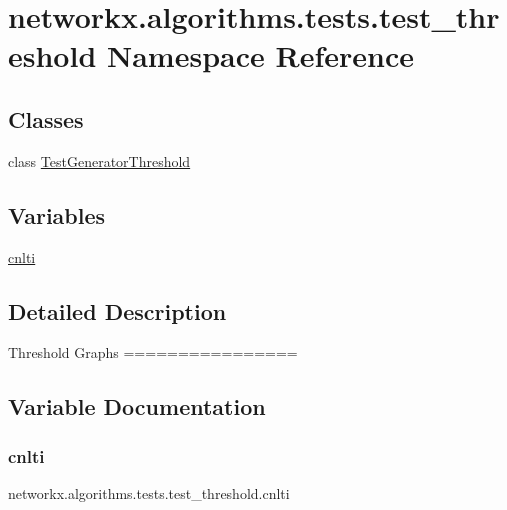 \hypertarget{namespacenetworkx_1_1algorithms_1_1tests_1_1test__threshold}{}\section{networkx.\+algorithms.\+tests.\+test\+\_\+threshold Namespace Reference}
\label{namespacenetworkx_1_1algorithms_1_1tests_1_1test__threshold}
\subsection*{Classes}
\begin{DoxyCompactItemize}
\item 
class \hyperlink{classnetworkx_1_1algorithms_1_1tests_1_1test__threshold_1_1TestGeneratorThreshold}{Test\+Generator\+Threshold}
\end{DoxyCompactItemize}
\subsection*{Variables}
\begin{DoxyCompactItemize}
\item 
\hyperlink{namespacenetworkx_1_1algorithms_1_1tests_1_1test__threshold_a60e90122d088f9650f29885c37e0d6d9}{cnlti}
\end{DoxyCompactItemize}


\subsection{Detailed Description}
\begin{DoxyVerb}Threshold Graphs
================
\end{DoxyVerb}
 

\subsection{Variable Documentation}
\mbox{\label{namespacenetworkx_1_1algorithms_1_1tests_1_1test__threshold_a60e90122d088f9650f29885c37e0d6d9}} 
\subsubsection{\texorpdfstring{cnlti}{cnlti}}
{\footnotesize\ttfamily networkx.\+algorithms.\+tests.\+test\+\_\+threshold.\+cnlti}

